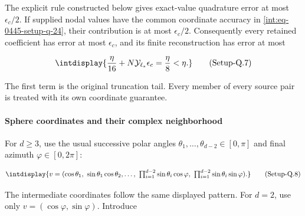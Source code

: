 
The explicit rule constructed below gives exact-value quadrature error at most \(\epsilon_c/2\). If supplied nodal values have the common coordinate accuracy in \hyperref[int:eq-setup-q-24]{\eqref{int:eq-0445-setup-q-24}}, their contribution is at most \(\epsilon_c/2\). Consequently every retained coefficient has error at most \(\epsilon_c\), and its finite reconstruction has error at most


\label{int:eq-setup-q-7}
\begingroup\renewcommand{\theHequation}{intdisplay.875}
\begin{equation}
\intdisplay{
\frac{\eta}{16}+N\mathcal Y_{\ell_*}\epsilon_c=\frac{\eta}{8}<\eta.
}
\tag{Setup-Q.7}
\label{int:eq-0428-setup-q-7}
\end{equation}
\endgroup


The first term is the original truncation tail. Every member of every source pair is treated with its own coordinate guarantee.


\paragraph{Sphere coordinates and their complex neighborhood}
\label{int:setup-quadrature-2}
\mbox{}\par\smallskip


For \(d\ge3\), use the usual successive polar angles \(\theta_1,\allowbreak \ldots,\allowbreak \theta_{d-2}\in[0,\allowbreak \pi]\) and final azimuth \(\varphi\in[0,\allowbreak 2\pi]\):


\label{int:eq-setup-q-8}
\begingroup\renewcommand{\theHequation}{intdisplay.876}
\begin{equation}
\intdisplay{
v=(\cos\theta_1,\ \sin\theta_1\cos\theta_2,\ldots,
\ \textstyle\prod_{i=1}^{d-2}\sin\theta_i\cos\varphi,
\ \textstyle\prod_{i=1}^{d-2}\sin\theta_i\sin\varphi).
}
\tag{Setup-Q.8}
\label{int:eq-0429-setup-q-8}
\end{equation}
\endgroup


The intermediate coordinates follow the same displayed pattern. For \(d=2\), use only \(v=(\cos\varphi,\allowbreak \sin\varphi)\). Introduce


